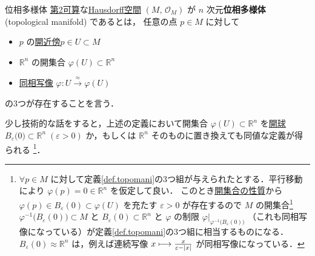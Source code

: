\documentclass[geometry_main]{subfiles}
\begin{document}
\begin{mydef}[label=def.topomani, breakable]{位相多様体}
	\hyperref[def:second-countable]{第2可算}な\hyperref[def:separation]{Hausdorff空間} $(M,\, \mathscr{O}_M)$ が
	$n$ 次元\textbf{位相多様体} (topological manifold) であるとは，
	任意の点 $p \in M$ に対して
	\begin{itemize}
		\item $p$ の\hyperref[def:neighborhood]{開近傍}$p \in U \subset M$
		\item $\mathbb{R}^n$ の開集合 $\varphi(U) \subset \mathbb{R}^n$
		\item \hyperref[def.homeo]{同相写像}
		$\varphi \colon U \xrightarrow{\approx} \varphi(U)$
	\end{itemize}
	の3つが存在することを言う．
\end{mydef}
少し技術的な話をすると，上述の定義において開集合 $\varphi(U) \subset \mathbb{R}^n$ を\hyperref[def:epsilon-neighbourhood]{開球} $B_{\varepsilon} \bigl(0\bigr) \subset \mathbb{R}^n\; (\varepsilon > 0)$ か，もしくは $\mathbb{R}^n$ そのものに置き換えても同値な定義が得られる
\footnote{$\forall p \in M$ に対して定義\ref{def.topomani}の3つ組が与えられたとする．平行移動により $\varphi(p) = 0 \in \mathbb{R}^n$ を仮定して良い．
このとき\hyperref[prop.opdet]{開集合の性質}から $\varphi(p) \in B_\varepsilon (0) \subset \varphi(U)$ を充たす $\varepsilon > 0$ が存在するので
$M$ の開集合\footnote{$\varphi$ の\hyperref[def.continuous]{連続性}より $\varphi^{-1} \bigl(B_\varepsilon (0) \bigr)$ は $M$ の開集合．} $\varphi^{-1} \bigl(B_\varepsilon (0) \bigr) \subset M$ と $B_\varepsilon(0) \subset \mathbb{R}^n$ と $\varphi$ の制限 $\varphi|_{\varphi^{-1}\bigl(B_\varepsilon(0)\bigr)}$ （これも同相写像になっている）が定義\ref{def.topomani}の3つ組に相当するものになる．
$B_\varepsilon (0) \approx \mathbb{R}^n$ は，例えば連続写像 $x \longmapsto \frac{x}{\varepsilon-\abs{x}}$ が同相写像になっている．
}．
\end{document}
